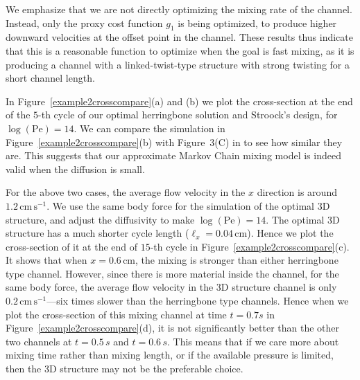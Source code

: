 \documentclass[times]{fldauth}
\begin{document}
We emphasize that we are not directly optimizing the mixing rate of
the channel. Instead, only the proxy cost function $g_1$ is being
optimized, to produce higher downward velocities at the offset point
in the channel. These results thus indicate that this is a reasonable
function to optimize when the goal is fast mixing, as it is producing
a channel with a linked-twist-type structure with strong twisting for
a short channel length.

In Figure~\ref{example2crosscompare}(a) and (b) we plot the
cross-section at the end of the $5$-th cycle of our optimal
herringbone solution and Stroock's design, for
$\log(\text{Pe})=14$. We can compare the simulation in
Figure~\ref{example2crosscompare}(b) with Figure~3(C) in
\cite{Stroock2002} to see how similar they are.  This suggests that
our approximate Markov Chain mixing model is indeed valid when the
diffusion is small.

For the above two cases, the average flow velocity in the $x$
direction is around $1.2\, \text{cm} \,\text{s}^{-1}$. We use the same
body force for the simulation of the optimal 3D structure, and
adjust the diffusivity to make $\log(\text{Pe})=14$. The optimal 3D
structure has a much shorter cycle length
($\ell_x=0.04\,\text{cm}$). Hence we plot the cross-section of it at
the end of $15$-th cycle in Figure~\ref{example2crosscompare}(c). It
shows that when $x=0.6\, \text{cm}$, the mixing is stronger than
either herringbone type channel. However, since there is more material
inside the channel, for the same body force, the average flow velocity
in the 3D structure channel is only $0.2\, \text{cm}
\,\text{s}^{-1}$---six times slower than the herringbone type
channels. Hence when we plot the cross-section of this mixing channel
at time $t=0.7s$ in Figure~\ref{example2crosscompare}(d), it is not
significantly better than the other two channels at $t=0.5\,s$ and
$t=0.6\,s$. This means that if we care more about mixing time rather
than mixing length, or if the available pressure is limited, then the
3D structure may not be the preferable choice.
\end{document}
